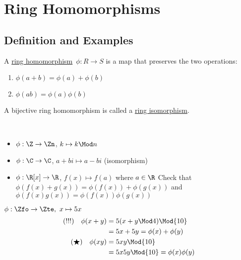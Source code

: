 


\section{Ring Homomorphisms}
\subsection{Definition and Examples}
  \begin{definition}
    A \ul{ring homomorphism}\  \( \phi: R\to S \) is a map that preserves the two operations:
    \begin{enumerate}
      \item \( \phi(a+b) = \phi(a) + \phi(b) \)
      \item \( \phi(ab) = \phi(a)\phi(b) \)
    \end{enumerate}
    A bijective ring homomorphism is called a \ul{ring isomorphism}.
  \end{definition}

\begin{examples}\
  \begin{itemize}
    \item \( \phi:\Z\to\Zn \), \( k\mapsto k\Mod n \)
    \item \( \phi:\C\to\C \), \( a+bi\mapsto a-bi \) (isomorphism)
    \item \( \phi:\R[x]\to\R \), \( f(x)\mapsto f(a) \) where \( a\in\R \)
    Check that \( \phi(f(x) + g(x)) = \phi(f(x)) + \phi(g(x)) \) and \( \phi(f(x)g(x)) = \phi(f(x))\phi(g(x)) \)
  \end{itemize}
\end{examples}

\begin{example}
  \( \phi:\Zfo\to\Zte,\ x\mapsto 5x \)
  \begin{align*}
    (!!!)\quad \phi(x+y) &= 5(x+y\Mod 4) \Mod{10} \\
    &= 5x+5y = \phi(x)+\phi(y) \\
    (\bigstar)\quad \phi(xy) &= 5xy \Mod{10} \\
    &= 5x 5y \Mod{10} = \phi(x)\phi(y)
  \end{align*}
\end{example}

